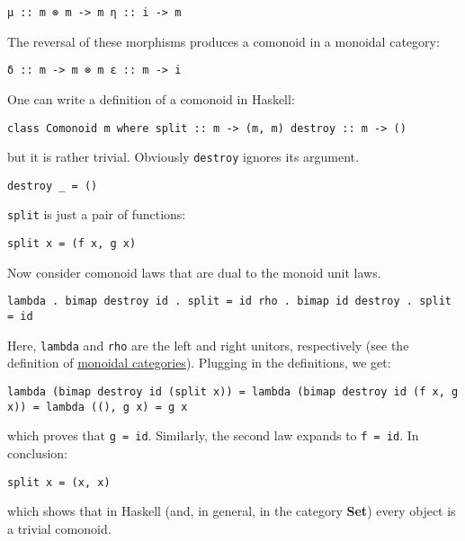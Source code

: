 \begin{verbatim}
μ :: m ⊗ m -> m η :: i -> m
\end{verbatim}

The reversal of these morphisms produces a comonoid in a monoidal
category:

\begin{verbatim}
δ :: m -> m ⊗ m ε :: m -> i
\end{verbatim}

One can write a definition of a comonoid in Haskell:

\begin{verbatim}
class Comonoid m where split :: m -> (m, m) destroy :: m -> ()
\end{verbatim}

but it is rather trivial. Obviously \texttt{destroy} ignores its
argument.

\begin{verbatim}
destroy _ = ()
\end{verbatim}

\texttt{split} is just a pair of functions:

\begin{verbatim}
split x = (f x, g x)
\end{verbatim}

Now consider comonoid laws that are dual to the monoid unit laws.

\begin{verbatim}
lambda . bimap destroy id . split = id rho . bimap id destroy . split = id
\end{verbatim}

Here, \texttt{lambda} and \texttt{rho} are the left and right unitors,
respectively (see the definition of
\href{https://bartoszmilewski.com/2016/12/27/monads-categorically/}{monoidal
categories}). Plugging in the definitions, we get:

\begin{verbatim}
lambda (bimap destroy id (split x)) = lambda (bimap destroy id (f x, g x)) = lambda ((), g x) = g x
\end{verbatim}

which proves that \texttt{g\ =\ id}. Similarly, the second law expands
to \texttt{f\ =\ id}. In conclusion:

\begin{verbatim}
split x = (x, x)
\end{verbatim}

which shows that in Haskell (and, in general, in the category
\textbf{Set}) every object is a trivial comonoid.

